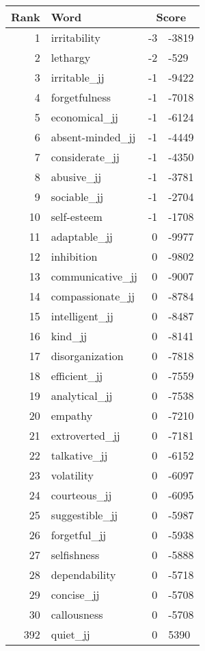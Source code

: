 \begin{longtable}[!htbp]{| rlr@{.}l |}
    \hline
    \textbf{Rank} & \textbf{Word} & \multicolumn{2}{c|}{\textbf{Score}} \\
    \hline
    \endhead
    1 & irritability & -3 & -3819 \\
    2 & lethargy & -2 & -529 \\
    3 & irritable\_jj & -1 & -9422 \\
    4 & forgetfulness & -1 & -7018 \\
    5 & economical\_jj & -1 & -6124 \\
    6 & absent-minded\_jj & -1 & -4449 \\
    7 & considerate\_jj & -1 & -4350 \\
    8 & abusive\_jj & -1 & -3781 \\
    9 & sociable\_jj & -1 & -2704 \\
    10 & self-esteem & -1 & -1708 \\
    11 & adaptable\_jj & 0 & -9977 \\
    12 & inhibition & 0 & -9802 \\
    13 & communicative\_jj & 0 & -9007 \\
    14 & compassionate\_jj & 0 & -8784 \\
    15 & intelligent\_jj & 0 & -8487 \\
    16 & kind\_jj & 0 & -8141 \\
    17 & disorganization & 0 & -7818 \\
    18 & efficient\_jj & 0 & -7559 \\
    19 & analytical\_jj & 0 & -7538 \\
    20 & empathy & 0 & -7210 \\
    21 & extroverted\_jj & 0 & -7181 \\
    22 & talkative\_jj & 0 & -6152 \\
    23 & volatility & 0 & -6097 \\
    24 & courteous\_jj & 0 & -6095 \\
    25 & suggestible\_jj & 0 & -5987 \\
    26 & forgetful\_jj & 0 & -5938 \\
    27 & selfishness & 0 & -5888 \\
    28 & dependability & 0 & -5718 \\
    29 & concise\_jj & 0 & -5708 \\
    30 & callousness & 0 & -5708 \\
    392 & quiet\_jj & 0 & 5390 \\

\end{longtable}
